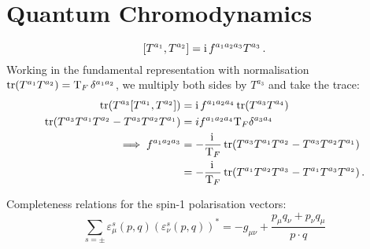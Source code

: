 \documentclass[main.tex]{subfiles}
\begin{document}
\section{Quantum Chromodynamics} \label{sec:QCD}
\begin{equation} \label{eq:liealgebra}
    [T^{a_1}, T^{a_2}] = \mathrm{i}\, f^{a_1a_2a_3} T^{a_3} \,.
\end{equation}
Working in the fundamental representation with normalisation $\operatorname{\rm tr}(T^{a_1} T^{a_2}) = \mathrm{T}_F \, \delta^{a_1a_2}$, we multiply both sides by $T^{a_3}$ and take the trace:
\begin{align} \label{eq:f(abc)}
    \operatorname{\rm tr}(T^{a_3}[T^{a_1}, T^{a_2}]) &= \mathrm{i}\, f^{a_1a_2a_4} \operatorname{\rm tr}(T^{a_3} T^{a_4}) \nonumber \\
    \operatorname{\rm tr}(T^{a_3} T^{a_1} T^{a_2} - T^{a_3} T^{a_2} T^{a_1}) &= if^{a_1a_2a_4} \mathrm{T}_F \delta^{a_3a_4} \nonumber \\ 
    \implies f^{a_1a_2a_3} &= -\frac{\mathrm{i}\,}{\mathrm{T}_F} \operatorname{\rm tr}(T^{a_3} T^{a_1} T^{a_2} - T^{a_3} T^{a_2} T^{a_1}) \nonumber \\
    &= -\frac{\mathrm{i}\,}{\mathrm{T}_F} \operatorname{\rm tr}(T^{a_1} T^{a_2} T^{a_3} - T^{a_1}T^{a_3} T^{a_2}) \,.
\end{align}

Completeness relations for the spin-1 polarisation vectors:
\begin{equation} \label{eq:completeness:bosons}
    \sum_{s=\pm} \varepsilon_\mu^s(p, q) (\varepsilon_\nu^s(p, q))^{\ast} = -g_{\mu\nu} + \frac{p_\mu q_\nu + p_\nu q_\mu}{p \cdot q}
\end{equation}
\end{document}

